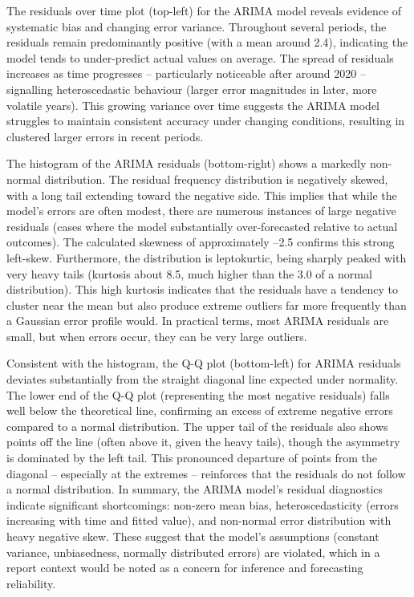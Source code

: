 \documentclass[12pt,a4paper]{report}
\begin{document}
The residuals over time plot (top-left) for the ARIMA model reveals evidence of systematic bias and changing error variance. Throughout several periods, the residuals remain predominantly positive (with a mean around 2.4), indicating the model tends to under-predict actual values on average. The spread of residuals increases as time progresses – particularly noticeable after around 2020 – signalling heteroscedastic behaviour (larger error magnitudes in later, more volatile years). This growing variance over time suggests the ARIMA model struggles to maintain consistent accuracy under changing conditions, resulting in clustered larger errors in recent periods. 
 
The histogram of the ARIMA residuals (bottom-right) shows a markedly non-normal distribution. The residual frequency distribution is negatively skewed, with a long tail extending toward the negative side. This implies that while the model's errors are often modest, there are numerous instances of large negative residuals (cases where the model substantially over-forecasted relative to actual outcomes). The calculated skewness of approximately –2.5 confirms this strong left-skew. Furthermore, the distribution is leptokurtic, being sharply peaked with very heavy tails (kurtosis about 8.5, much higher than the 3.0 of a normal distribution). This high kurtosis indicates that the residuals have a tendency to cluster near the mean but also produce extreme outliers far more frequently than a Gaussian error profile would. In practical terms, most ARIMA residuals are small, but when errors occur, they can be very large outliers. 

Consistent with the histogram, the Q-Q plot (bottom-left) for ARIMA residuals deviates substantially from the straight diagonal line expected under normality. The lower end of the Q-Q plot (representing the most negative residuals) falls well below the theoretical line, confirming an excess of extreme negative errors compared to a normal distribution. The upper tail of the residuals also shows points off the line (often above it, given the heavy tails), though the asymmetry is dominated by the left tail. This pronounced departure of points from the diagonal – especially at the extremes – reinforces that the residuals do not follow a normal distribution. In summary, the ARIMA model's residual diagnostics indicate significant shortcomings: non-zero mean bias, heteroscedasticity (errors increasing with time and fitted value), and non-normal error distribution with heavy negative skew. These suggest that the model's assumptions (constant variance, unbiasedness, normally distributed errors) are violated, which in a report context would be noted as a concern for inference and forecasting reliability.
\end{document}
